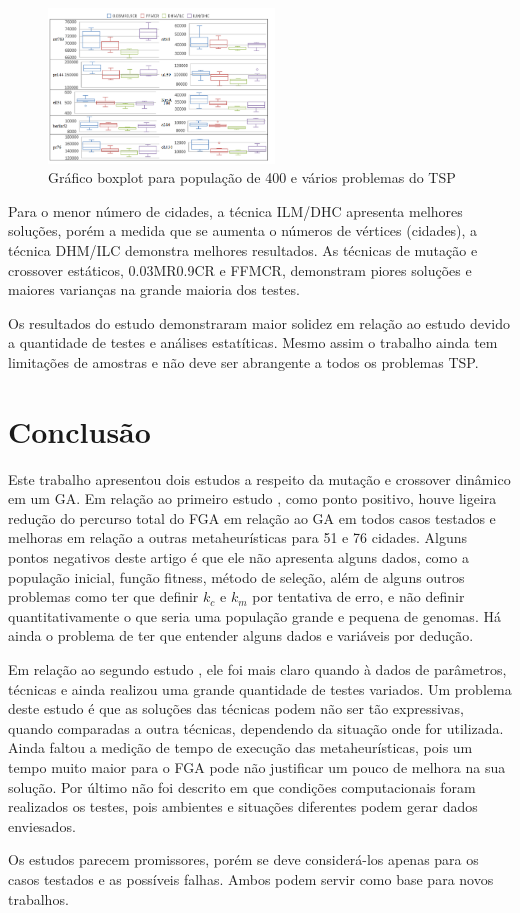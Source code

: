 \documentclass[conference]{IEEEtran}
\begin{document}
\begin{figure}[ht]
\centering
\includegraphics[width=6cm]{m-c_boxplot_size400.png}
\caption{\label{img:m-c_boxplot_size400} Gráfico boxplot para população de 400 e vários problemas do TSP} 
\end{figure}

Para o menor número de cidades, a técnica ILM/DHC apresenta melhores soluções, porém a medida que se aumenta o números de vértices (cidades), a técnica DHM/ILC demonstra melhores resultados. As técnicas de mutação e crossover estáticos, 0.03MR0.9CR e FFMCR, demonstram piores soluções e maiores varianças na grande maioria dos testes. 

Os resultados do estudo \cite{m-c} demonstraram maior solidez em relação ao estudo \cite{fga} devido a quantidade de testes e análises estatíticas. Mesmo assim o trabalho ainda tem limitações de amostras e não deve ser abrangente a todos os problemas TSP.

\section{Conclusão}

\label{sec:conclusion}

Este trabalho apresentou dois estudos a respeito da mutação e crossover dinâmico em um GA. 
Em relação ao primeiro estudo \cite{fga}, como ponto positivo, houve ligeira redução do percurso total do FGA em relação ao GA em todos casos testados e melhoras em relação a outras metaheurísticas para 51 e 76 cidades. Alguns pontos negativos deste artigo é que ele não apresenta alguns dados, como a população inicial, função fitness, método de seleção, além de alguns outros problemas como ter que definir $k_c$ e $k_m$ por tentativa de erro, e não definir quantitativamente o que seria uma população grande e pequena de genomas. Há ainda o problema de ter que entender alguns dados e variáveis por dedução.

Em relação ao segundo estudo \cite{m-c}, ele foi mais claro quando à dados de parâmetros, técnicas e ainda realizou uma grande quantidade de testes variados. Um problema deste estudo é que as soluções das técnicas podem não ser tão expressivas, quando comparadas a outra técnicas, dependendo da situação onde for utilizada. Ainda faltou a medição de tempo de execução das metaheurísticas, pois um tempo muito maior para o FGA pode não justificar um pouco de melhora na sua solução. Por último não foi descrito em que condições computacionais foram realizados os testes, pois ambientes e situações diferentes podem gerar dados enviesados.

Os estudos parecem promissores, porém se deve considerá-los apenas para os casos testados e as possíveis falhas. Ambos podem servir como base para novos trabalhos.

\newpage 


\end{document}
